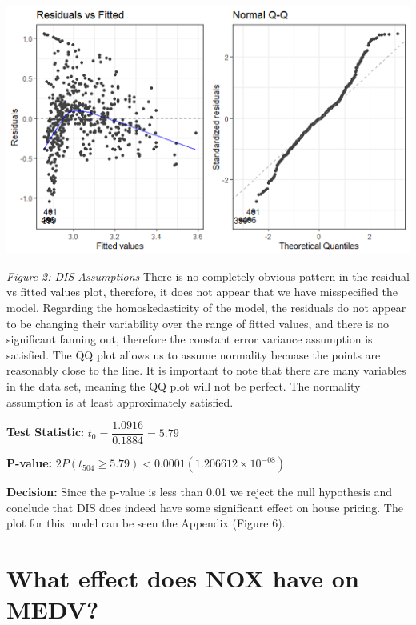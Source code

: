 \documentclass[a4paper,9pt,twocolumn,twoside,]{pinp}
\begin{document}
\begin{center}\includegraphics[width=0.95\linewidth]{inference_dis} \end{center}

\emph{Figure 2: DIS Assumptions} \newline \newline There is no
completely obvious pattern in the residual vs fitted values plot,
therefore, it does not appear that we have misspecified the model.
Regarding the homoskedasticity of the model, the residuals do not appear
to be changing their variability over the range of fitted values, and
there is no significant fanning out, therefore the constant error
variance assumption is satisfied. The QQ plot allows us to assume
normality becuase the points are reasonably close to the line. It is
important to note that there are many variables in the data set, meaning
the QQ plot will not be perfect. The normality assumption is at least
approximately satisfied.

\textbf{Test Statistic}: \(t_0 = \dfrac{1.0916}{0.1884} = 5.79\)
\newline

\textbf{P-value: }
\(2P(t_{504 }\ge 5.79) < 0.0001 (1.206612 \times 10^{-08})\) \newline

\textbf{Decision: } Since the p-value is less than 0.01 we reject the
null hypothesis and conclude that DIS does indeed have some significant
effect on house pricing. The plot for this model can be seen the
Appendix (Figure 6).

\hypertarget{what-effect-does-nox-have-on-medv}{%
\section{What effect does NOX have on
MEDV?}\label{what-effect-does-nox-have-on-medv}}
\end{document}
